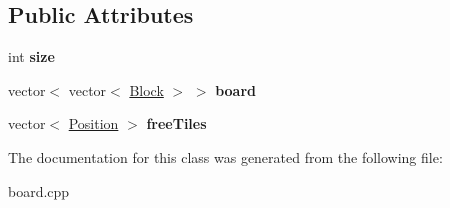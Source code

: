 \subsection*{Public Attributes}
\begin{DoxyCompactItemize}
\item 
\hypertarget{classBoard_aedef7105f0accc0949b601afa97e9678}{int {\bfseries size}}\label{classBoard_aedef7105f0accc0949b601afa97e9678}

\item 
\hypertarget{classBoard_a31498d6cd3529ff5aaccfbfce4d61f3e}{vector$<$ vector$<$ \hyperlink{classBlock}{Block} $>$ $>$ {\bfseries board}}\label{classBoard_a31498d6cd3529ff5aaccfbfce4d61f3e}

\item 
\hypertarget{classBoard_aea639ef28feb40afadff2b6311bc11c1}{vector$<$ \hyperlink{classPosition}{Position} $>$ {\bfseries free\-Tiles}}\label{classBoard_aea639ef28feb40afadff2b6311bc11c1}

\end{DoxyCompactItemize}


The documentation for this class was generated from the following file\-:\begin{DoxyCompactItemize}
\item 
board.\-cpp\end{DoxyCompactItemize}

